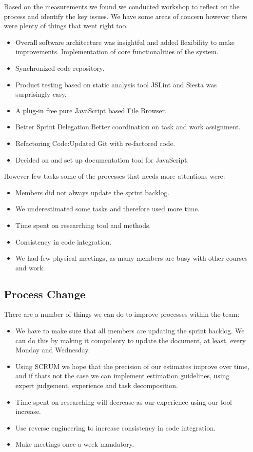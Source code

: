 Based on the measurements we found we conducted workshop to reflect on the process and identify the key issues. We have  some areas of concern however there were plenty of things that went right too.

\begin{itemize}
	\item	Overall software architecture was insightful and added flexibility to make improvements. Implementation of core functionalities of  the system.
	\item	Synchronized code repository.
	\item	Product testing based on static analysis tool JSLint and Siesta was surprisingly easy.
	\item	A plug-in free pure JavaScript based File Browser.
	\item	Better Sprint Delegation:Better coordination on task and work assignment.
	\item	Refactoring Code:Updated Git with re-factored code.
	\item	Decided on and set up documentation tool for JavaScript.
\end{itemize}

However few tasks some of the processes that needs more attentions were:
\begin{itemize}
	\item Members did not always update the sprint backlog.
	\item We underestimated some tasks and therefore used more time.
	\item Time spent on researching tool and methods.
	\item Consistency in code integration.
	\item We had few physical meetings, as many members are busy with other courses and work.
\end{itemize}

\subsection{Process Change}
There are a number of things we can do to improve processes within the team:
\begin{itemize}
	\item We have to make sure that all members are updating the sprint backlog. We can do this by making it compulsory to update the document, at least, every Monday and Wednesday.
	\item Using SCRUM we hope that the precision of our estimates improve over time, and if thats not the case we can implement estimation guidelines, using expert judgement, experience and task decomposition.
	\item Time spent on researching will decrease as our experience using our tool increase.
	\item Use reverse engineering to increase consistency in code integration.
	\item Make meetings once a week mandatory.
\end{itemize}

